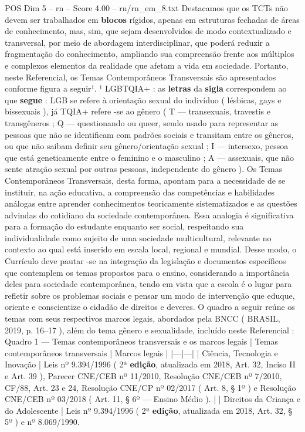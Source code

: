\begin{textsample}{POS Dim 5 – rn – Score 4.00 – rn/rn\_em\_8.txt}
Destacamos que os TCTs não devem ser trabalhados em \textbf{blocos} rígidos, apenas em estruturas fechadas de áreas de conhecimento, mas, sim, que sejam desenvolvidos de modo contextualizado e transversal, por meio de abordagem interdisciplinar, que poderá reduzir a fragmentação do conhecimento, ampliando sua compreensão frente aos múltiplos e complexos elementos da realidade que afetam a vida em sociedade.
Portanto, neste Referencial, os Temas Contemporâneos Transversais são apresentados conforme figura a seguir¹. ¹ LGBTQIA+ : as \textbf{letras} da \textbf{sigla} correspondem ao que \textbf{segue} : LGB se refere à orientação sexual do indivíduo ( lésbicas, gays e bissexuais ), já TQIA+ refere -se ao gênero ( T — transexuais, travestis e transgêneros ; Q — questionando ou queer, sendo usado para representar as pessoas que não se identificam com padrões sociais e transitam entre os gêneros, ou que não saibam definir seu gênero/orientação sexual ; I — intersexo, pessoa que está geneticamente entre o feminino e o masculino ; A — assexuais, que não sente atração sexual por outras pessoas, independente do gênero ).
Os Temas Contemporâneos Transversais, desta forma, apontam para a necessidade de se instituir, na ação educativa, a compreensão das competências e habilidades análogas entre aprender conhecimentos teoricamente sistematizados e as questões advindas do cotidiano da sociedade contemporânea.
Essa analogia é significativa para a formação do estudante enquanto ser social, respeitando sua individualidade como sujeito de uma sociedade multicultural, relevante no contexto ao qual está inserido em escala local, regional e mundial.
Desse modo, o Currículo deve pautar -se na integração da legislação e documentos específicos que contemplem os temas propostos para o ensino, considerando a importância deles para sociedade contemporânea, tendo em vista que a escola é o lugar para refletir sobre os problemas sociais e pensar um modo de intervenção que eduque, oriente e conscientize o cidadão de direitos e deveres.
O quadro a seguir reúne os temas com seus respectivos marcos legais, abordados pela BNCC ( BRASIL, 2019, p. 16–17 ), além do tema gênero e sexualidade, incluído neste Referencial : Quadro 1 — Temas contemporâneos transversais e os marcos legais | Temas contemporâneos transversais | Marcos legais | |---|---| | Ciência, Tecnologia e Inovação | Leis nº 9.394/1996 ( 2ª \textbf{edição}, atualizada em 2018, Art. 32, Inciso II e Art. 39 ), Parecer CNE/CEB nº 11/2010, Resolução CNE/CEB nº 7/2010, CF/88, Art. 23 e 24, Resolução CNE/CP nº 02/2017 ( Art. 8, § 1º ) e Resolução CNE/CEB nº 03/2018 ( Art. 11, § 6º — Ensino Médio ). | | Direitos da Criança e do Adolescente | Leis nº 9.394/1996 ( 2ª \textbf{edição}, atualizada em 2018, Art. 32, § 5º ) e nº 8.069/1990.

\end{textsample}
